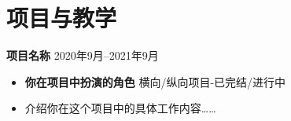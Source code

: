 \documentclass[11pt]{article}
\newlength{\iconwidth}
\begin{document}
    \begin{minipage}[t]{\textwidth}
    \section[项目与教学]{\makebox[\iconwidth][c]{\color{SYSU_Green}{\faChalkboardTeacher}}\quad 项目与教学}
    
    {\large \textbf{项目名称}} \hfill 2020年9月--2021年9月
    \begin{itemize}
        \item \textbf{你在项目中扮演的角色} \hfill 横向/纵向项目-已完结/进行中
        \item 介绍你在这个项目中的具体工作内容\dots\dots
    \end{itemize}



    \vspace{1.2em}
    \end{minipage}
\newpage
\end{document}
